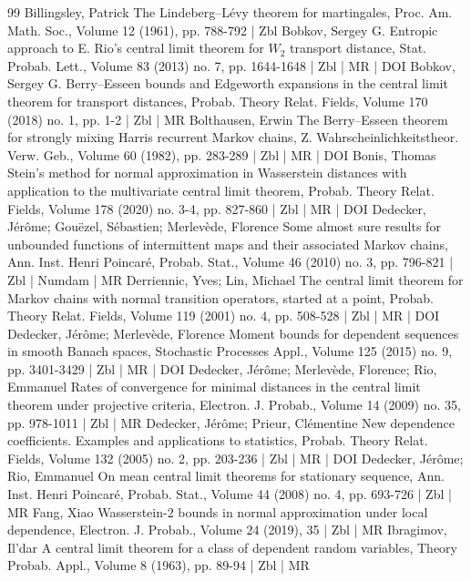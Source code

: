 \begin{thebibliography}{99}
 Billingsley, Patrick The Lindeberg–Lévy theorem for martingales, Proc. Am. Math. Soc., Volume 12 (1961), pp. 788-792 | Zbl
 Bobkov, Sergey G. Entropic approach to E. Rio’s central limit theorem for ${W}_2$ transport distance, Stat. Probab. Lett., Volume 83 (2013) no. 7, pp. 1644-1648 | Zbl | MR | DOI
 Bobkov, Sergey G. Berry–Esseen bounds and Edgeworth expansions in the central limit theorem for transport distances, Probab. Theory Relat. Fields, Volume 170 (2018) no. 1, pp. 1-2 | Zbl | MR
 Bolthausen, Erwin The Berry–Esseen theorem for strongly mixing Harris recurrent Markov chains, Z. Wahrscheinlichkeitstheor. Verw. Geb., Volume 60 (1982), pp. 283-289 | Zbl | MR | DOI
 Bonis, Thomas Stein’s method for normal approximation in Wasserstein distances with application to the multivariate central limit theorem, Probab. Theory Relat. Fields, Volume 178 (2020) no. 3-4, pp. 827-860 | Zbl | MR | DOI
 Dedecker, Jérôme; Gouëzel, Sébastien; Merlevède, Florence Some almost sure results for unbounded functions of intermittent maps and their associated Markov chains, Ann. Inst. Henri Poincaré, Probab. Stat., Volume 46 (2010) no. 3, pp. 796-821 | Zbl | Numdam | MR
 Derriennic, Yves; Lin, Michael The central limit theorem for Markov chains with normal transition operators, started at a point, Probab. Theory Relat. Fields, Volume 119 (2001) no. 4, pp. 508-528 | Zbl | MR | DOI
 Dedecker, Jérôme; Merlevède, Florence Moment bounds for dependent sequences in smooth Banach spaces, Stochastic Processes Appl., Volume 125 (2015) no. 9, pp. 3401-3429 | Zbl | MR | DOI
 Dedecker, Jérôme; Merlevède, Florence; Rio, Emmanuel Rates of convergence for minimal distances in the central limit theorem under projective criteria, Electron. J. Probab., Volume 14 (2009) no. 35, pp. 978-1011 | Zbl | MR
 Dedecker, Jérôme; Prieur, Clémentine New dependence coefficients. Examples and applications to statistics, Probab. Theory Relat. Fields, Volume 132 (2005) no. 2, pp. 203-236 | Zbl | MR | DOI
 Dedecker, Jérôme; Rio, Emmanuel On mean central limit theorems for stationary sequence, Ann. Inst. Henri Poincaré, Probab. Stat., Volume 44 (2008) no. 4, pp. 693-726 | Zbl | MR
 Fang, Xiao Wasserstein-2 bounds in normal approximation under local dependence, Electron. J. Probab., Volume 24 (2019), 35 | Zbl | MR
 Ibragimov, Il’dar A central limit theorem for a class of dependent random variables, Theory Probab. Appl., Volume 8 (1963), pp. 89-94 | Zbl | MR

\end{thebibliography}

